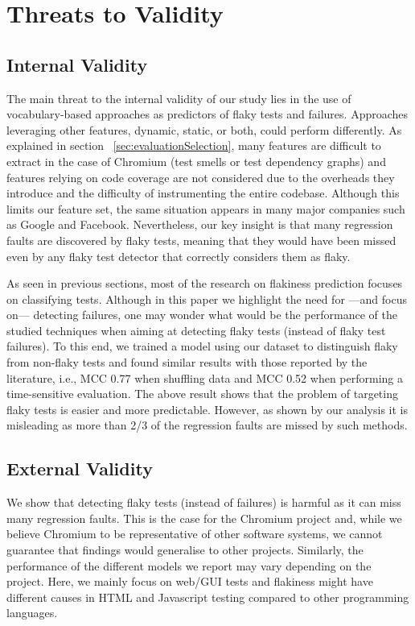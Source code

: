 \section{Threats to Validity}
\label{sec:chromium-threats}

\subsection{Internal Validity}
The main threat to the internal validity of our study lies in the use of vocabulary-based approaches as predictors of flaky tests and failures. Approaches leveraging other features, \ie dynamic, static, or both, could perform differently. As explained in section ~\ref{sec:evaluationSelection}, many features are difficult to extract in the case of Chromium (\eg test smells or test dependency graphs) and features relying on code coverage are not considered due to the overheads they introduce and the difficulty of instrumenting the entire codebase. Although this limits our feature set, the same situation appears in many major companies such as Google and Facebook. Nevertheless, our key insight is that many regression faults are discovered by flaky tests, meaning that they would have been missed even by any flaky test detector that correctly considers them as flaky. 

As seen in previous sections, most of the research on flakiness prediction focuses on classifying tests. Although in this paper we highlight the need for ---and focus on--- detecting failures, one may wonder what would be the performance of the studied techniques when aiming at detecting flaky tests (instead of flaky test failures). To this end, we trained a model using our dataset to distinguish flaky from non-flaky tests and found similar results with those reported by the literature, i.e., MCC 0.77 when shuffling data and MCC 0.52 when performing a time-sensitive evaluation. The above result shows that the problem of targeting flaky tests is easier and more predictable. However, as shown by our analysis it is misleading as more than 2/3 of the regression faults are missed by such methods. 

\subsection{External Validity}
We show that detecting flaky tests (instead of failures) is harmful as it can miss many regression faults. This is the case for the Chromium project and, while we believe Chromium to be representative of other software systems, we cannot guarantee that findings would generalise to other projects. Similarly, the performance of the different models we report may vary depending on the project. Here, we mainly focus on web/GUI tests and flakiness might have different causes in HTML and Javascript testing compared to other programming languages. 

